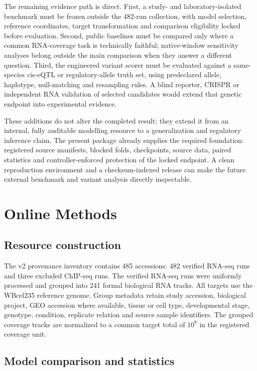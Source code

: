 \documentclass[pdflatex,sn-nature]{sn-jnl}
\begin{document}
The remaining evidence path is direct. First, a study- and laboratory-isolated benchmark must be frozen outside the 482-run collection, with model selection, reference coordinates, target transformation and comparison eligibility locked before evaluation. Second, public baselines must be compared only where a common RNA-coverage task is technically faithful; native-window sensitivity analyses belong outside the main comparison when they answer a different question. Third, the engineered variant scorer must be evaluated against a same-species cis-eQTL or regulatory-allele truth set, using predeclared allele, haplotype, null-matching and resampling rules. A blind reporter, CRISPR or independent RNA validation of selected candidates would extend that genetic endpoint into experimental evidence.

These additions do not alter the completed result; they extend it from an internal, fully auditable modelling resource to a generalization and regulatory inference claim. The present package already supplies the required foundation: registered source manifests, blocked folds, checkpoints, source data, paired statistics and controller-enforced protection of the locked endpoint. A clean reproduction environment and a checksum-indexed release can make the future external benchmark and variant analysis directly inspectable.

\section{Online Methods}

\subsection{Resource construction}

The v2 provenance inventory contains 485 accessions: 482 verified RNA-seq runs and three excluded ChIP-seq runs. The verified RNA-seq runs were uniformly processed and grouped into 241 formal biological RNA tracks. All targets use the WBcel235 reference genome. Group metadata retain study accession, biological project, GEO accession where available, tissue or cell type, developmental stage, genotype, condition, replicate relation and source sample identifiers. The grouped coverage tracks are normalized to a common target total of $10^8$ in the registered coverage unit.

\subsection{Model comparison and statistics}
\end{document}
